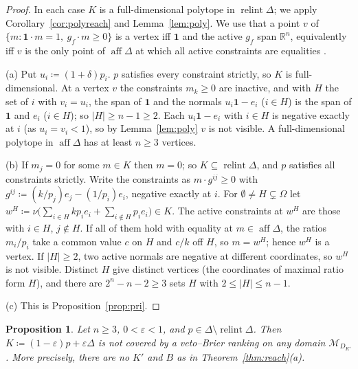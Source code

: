 \documentclass[11pt]{article}
\newcommand{\R}{\mathbb{R}}
\newcommand{\one}{\mathbf{1}}
\newcommand{\M}{\mathcal{M}}
\DeclareMathOperator{\relint}{relint}
\DeclareMathOperator{\aff}{aff}
\theoremstyle{plain}
\newtheorem{proposition}[theorem]{Proposition}
\theoremstyle{definition}
\theoremstyle{remark}
\begin{document}
\begin{proof}
In each case $K$ is a full-dimensional polytope in $\relint\Delta$; we apply
Corollary~\ref{cor:polyreach} and Lemma~\ref{lem:poly}. We use that a point $v$ of
$\{m:\one\cdot m=1,\ g_f\cdot m\ge0\}$ is a vertex iff $\one$ and the active $g_f$ span
$\R^n$, equivalently iff $v$ is the only point of $\aff\Delta$ at which all active
constraints are equalities \cite[Sec.~8.5]{Schrijver}.

(a) Put $u_i\coloneqq(1+\delta)p_i$. $p$ satisfies every constraint strictly, so $K$ is
full-dimensional. At a vertex $v$ the constraints $m_k\ge0$ are inactive, and with $H$ the
set of $i$ with $v_i=u_i$, the span of $\one$ and the normals $u_i\one-e_i$ ($i\in H$)
is the span of $\one$ and $e_i$ ($i\in H$); so $|H|\ge n-1\ge2$. Each $u_i\one-e_i$ with
$i\in H$ is negative exactly at $i$ (as $u_i=v_i<1$), so by Lemma~\ref{lem:poly} $v$ is
not visible. A full-dimensional polytope in $\aff\Delta$ has at least $n\ge3$ vertices.

(b) If $m_j=0$ for some $m\in K$ then $m=0$; so $K\subseteq\relint\Delta$, and $p$
satisfies all constraints strictly. Write the constraints as $m\cdot g^{ij}\ge0$ with
$g^{ij}\coloneqq(k/p_j)e_j-(1/p_i)e_i$, negative exactly at $i$. For $\emptyset\neq H
\subsetneq\Omega$ let $w^H\coloneqq\nu\bigl(\sum_{i\in H}kp_ie_i+\sum_{i\notin H}p_ie_i
\bigr)\in K$. The active constraints at $w^H$ are those with $i\in H$, $j\notin H$. If all
of them hold with equality at $m\in\aff\Delta$, the ratios $m_i/p_i$ take a common value
$c$ on $H$ and $c/k$ off $H$, so $m=w^H$; hence $w^H$ is a vertex. If $|H|\ge2$, two
active normals are negative at different coordinates, so $w^H$ is not visible. Distinct
$H$ give distinct vertices (the coordinates of maximal ratio form $H$), and there are
$2^n-n-2\ge3$ sets $H$ with $2\le|H|\le n-1$.

(c) This is Proposition~\ref{prop:pri}.
\end{proof}

\begin{proposition}\label{prop:contamzero}
Let $n\ge3$, $0<\varepsilon<1$, and $p\in\Delta\setminus\relint\Delta$. Then
$K\coloneqq(1-\varepsilon)p+\varepsilon\Delta$ is not covered by a veto--Brier ranking on
any domain $\M_{D_{K'}}$. More precisely, there are no $K'$ and $B$ as in
Theorem~\ref{thm:reach}(a).
\end{proposition}
\end{document}
